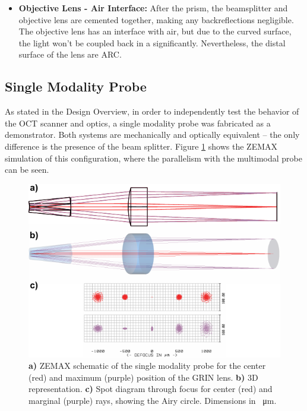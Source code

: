 \begin{itemize}
\item \textbf{Objective Lens - Air Interface:} After the prism, the beamsplitter and objective lens are cemented together, making any backreflections negligible. The objective lens has an interface with air, but due to the curved surface, the light won't be coupled back in a significantly. Nevertheless, the distal surface of the lens are ARC.

\end{itemize}

\subsection*{Single Modality Probe}
As stated in the Design Overview, in order to independently test the behavior of the OCT scanner and optics, a single modality probe was fabricated as a demonstrator. Both systems are mechanically and optically equivalent -- the only difference is the presence of the beam splitter. Figure \ref{fig:single} shows the ZEMAX simulation of this configuration, where the parallelism with the multimodal probe can be seen.

\begin{figure}[h!]\centering
      \includegraphics{figures/30_DesignSimulation/Optical/singleAll.pdf}
      \caption{\textbf{a)} ZEMAX schematic of the single modality probe for the center (red) and maximum (purple) position of the GRIN lens.
      \textbf{b)} 3D representation.
      \textbf{c)} Spot diagram through focus for center (red) and marginal (purple) rays, showing the Airy circle. Dimensions in \SI{}{\micro\meter}.}
      \label{fig:single}
\end{figure}


